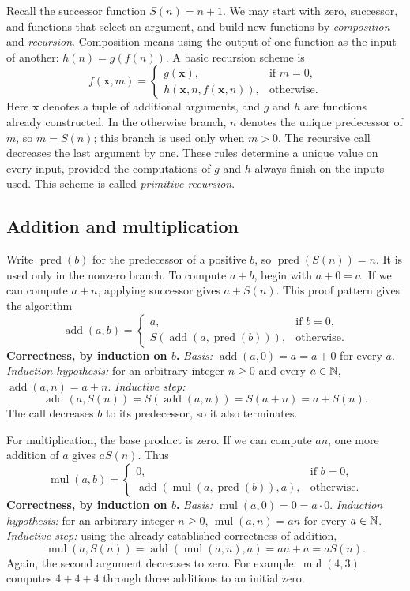 Recall the successor function $S(n)=n+1$. We may start with zero, successor,
and functions that select an argument, and build new functions by
\emph{composition} and \emph{recursion}. Composition means using the output
of one function as the input of another: $h(n)=g(f(n))$.
A basic recursion scheme is
\[
f(\mathbf{x},m)=\begin{cases}
g(\mathbf{x}),&\text{if }m=0,\\
h(\mathbf{x},n,f(\mathbf{x},n)),&\text{otherwise}.
\end{cases}
\]
Here $\mathbf{x}$ denotes a tuple of additional arguments, and $g$ and $h$
are functions already constructed. In the otherwise branch, $n$ denotes
the unique predecessor of $m$, so $m=S(n)$; this branch is used only when
$m>0$. The recursive call decreases the last argument by one. These rules
determine a unique value on every input, provided the computations of $g$
and $h$ always finish on the inputs used.
This scheme is called \emph{primitive recursion}.

\subsection{Addition and multiplication}

Write $\operatorname{pred}(b)$ for the predecessor of a positive $b$, so
$\operatorname{pred}(S(n))=n$. It is used only in the nonzero branch.
To compute $a+b$, begin with $a+0=a$. If we can compute $a+n$, applying
successor gives $a+S(n)$. This proof pattern gives the algorithm
\[
\operatorname{add}(a,b)=\begin{cases}
a,&\text{if }b=0,\\
S(\operatorname{add}(a,\operatorname{pred}(b))),&\text{otherwise}.
\end{cases}
\]
\textbf{Correctness, by induction on $b$.}
\emph{Basis:} $\operatorname{add}(a,0)=a=a+0$ for every $a$.
\emph{Induction hypothesis:} for an arbitrary integer $n\geq0$ and every $a\in\mathbb{N}$,
$\operatorname{add}(a,n)=a+n$.
\emph{Inductive step:}
\[
\operatorname{add}(a,S(n))=S(\operatorname{add}(a,n))
=S(a+n)=a+S(n).
\]
The call decreases $b$ to its predecessor, so it also terminates.

For multiplication, the base product is zero. If we can compute $an$, one
more addition of $a$ gives $aS(n)$. Thus
\[
\operatorname{mul}(a,b)=\begin{cases}
0,&\text{if }b=0,\\
\operatorname{add}(\operatorname{mul}(a,\operatorname{pred}(b)),a),&\text{otherwise}.
\end{cases}
\]
\textbf{Correctness, by induction on $b$.}
\emph{Basis:} $\operatorname{mul}(a,0)=0=a\cdot0$.
\emph{Induction hypothesis:} for an arbitrary integer $n\geq0$,
$\operatorname{mul}(a,n)=an$ for every $a\in\mathbb{N}$.
\emph{Inductive step:} using the already established correctness of addition,
\[
\operatorname{mul}(a,S(n))
=\operatorname{add}(\operatorname{mul}(a,n),a)=an+a=aS(n).
\]
Again, the second argument decreases to zero. For example,
$\operatorname{mul}(4,3)$ computes $4+4+4$ through three additions to an
initial zero.

